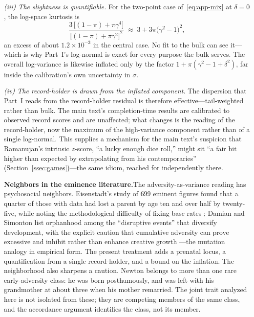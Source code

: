 \documentclass{article}
\begin{document}
\emph{(iii) The slightness is quantifiable.} For the two-point case of~\eqref{eq:app-mix} at $\delta = 0$, the log-space kurtosis is
\[
  \frac{3\,\bigl[(1-\pi) + \pi\gamma^{4}\bigr]}{\bigl[(1-\pi) + \pi\gamma^{2}\bigr]^{2}} \;\approx\; 3 + 3\pi\bigl(\gamma^{2}-1\bigr)^{2},
\]
an excess of about $1.2 \times 10^{-3}$ in the central case. No fit to the bulk can see it---which is why Part~I's log-normal is exact for every purpose the bulk serves. The overall log-variance is likewise inflated only by the factor $1 + \pi(\gamma^{2} - 1 + \delta^{2})$, far inside the calibration's own uncertainty in $\sigma$.

\emph{(iv) The record-holder is drawn from the inflated component.} The dispersion that Part~I reads from the record-holder residual is therefore effective---tail-weighted rather than bulk. The main text's completion-time results are calibrated to observed record scores and are unaffected; what changes is the reading of the record-holder, now the maximum of the high-variance component rather than of a single log-normal. This supplies a mechanism for the main text's suspicion that Ramanujan's intrinsic $z$-score, ``a lucky enough dice roll,'' might sit ``a fair bit higher than expected by extrapolating from his contemporaries'' (Section~\ref{ssec:games})---the same idiom, reached for independently there.


\par\medskip\noindent\textbf{Neighbors in the eminence literature.}\enspace The adversity-as-variance reading has psychosocial neighbors. Eisenstadt's study of $699$ eminent figures found that a quarter of those with data had lost a parent by age ten and over half by twenty-five, while noting the methodological difficulty of fixing base rates \cite{eisenstadt1978parental}; Damian and Simonton list orphanhood among the ``disruptive events'' that diversify development, with the explicit caution that cumulative adversity can prove excessive and inhibit rather than enhance creative growth \cite{damian2014diversifying}---the mutation analogy in empirical form. The present treatment adds a prenatal locus, a quantification from a single record-holder, and a bound on the inflation. The neighborhood also sharpens a caution. Newton belongs to more than one rare early-adversity class: he was born posthumously, and was left with his grandmother at about three when his mother remarried. The joint trait analyzed here is not isolated from these; they are competing members of the same class, and the accordance argument identifies the class, not its member.
\end{document}
